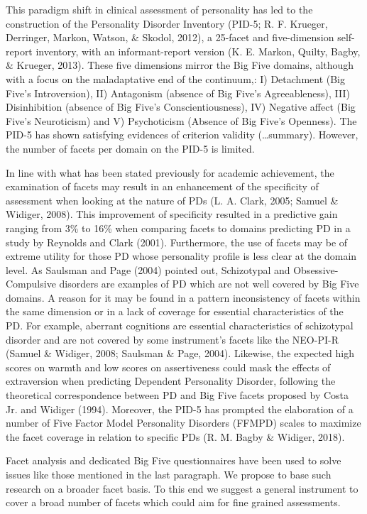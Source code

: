\documentclass[,man,floatsintext]{apa6}
\begin{document}
This paradigm shift in clinical assessment of personality has led to the
construction of the Personality Disorder Inventory (PID-5; R. F.
Krueger, Derringer, Markon, Watson, \& Skodol, 2012), a 25-facet and
five-dimension self-report inventory, with an informant-report version
(K. E. Markon, Quilty, Bagby, \& Krueger, 2013). These five dimensions
mirror the Big Five domains, although with a focus on the maladaptative
end of the continuum,: I) Detachment (Big Five's Introversion), II)
Antagonism (absence of Big Five's Agreeableness), III) Disinhibition
(absence of Big Five's Conscientiousness), IV) Negative affect (Big
Five's Neuroticism) and V) Psychoticism (Absence of Big Five's
Openness). The PID-5 has shown satisfying evidences of criterion
validity (\ldots{}summary). However, the number of facets per domain on
the PID-5 is limited.

In line with what has been stated previously for academic achievement,
the examination of facets may result in an enhancement of the
specificity of assessment when looking at the nature of PDs (L. A.
Clark, 2005; Samuel \& Widiger, 2008). This improvement of specificity
resulted in a predictive gain ranging from 3\% to 16\% when comparing
facets to domains predicting PD in a study by Reynolds and Clark (2001).
Furthermore, the use of facets may be of extreme utility for those PD
whose personality profile is less clear at the domain level. As Saulsman
and Page (2004) pointed out, Schizotypal and Obsessive-Compulsive
disorders are examples of PD which are not well covered by Big Five
domains. A reason for it may be found in a pattern inconsistency of
facets within the same dimension or in a lack of coverage for essential
characteristics of the PD. For example, aberrant cognitions are
essential characteristics of schizotypal disorder and are not covered by
some instrument's facets like the NEO-PI-R (Samuel \& Widiger, 2008;
Saulsman \& Page, 2004). Likewise, the expected high scores on warmth
and low scores on assertiveness could mask the effects of extraversion
when predicting Dependent Personality Disorder, following the
theoretical correspondence between PD and Big Five facets proposed by
Costa Jr. and Widiger (1994). Moreover, the PID-5 has prompted the
elaboration of a number of Five Factor Model Personality Disorders
(FFMPD) scales to maximize the facet coverage in relation to specific
PDs (R. M. Bagby \& Widiger, 2018).

Facet analysis and dedicated Big Five questionnaires have been used to
solve issues like those mentioned in the last paragraph. We propose to
base such research on a broader facet basis. To this end we suggest a
general instrument to cover a broad number of facets which could aim for
fine grained assessments.
\end{document}
